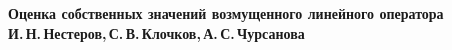 \documentclass[10pt,a4paper,oneside]{article}
\begin{document}
 
\begin{center}
    \textbf{\LARGE Оценка собственных значений возмущенного линейного оператора} \\[1em]
    \textbf{И.\,Н.\,Нестеров,\,С.\,В.\,Клочков,\,А.\,С.\,Чурсанова} \\[2em]
\end{center}




\end{document}
